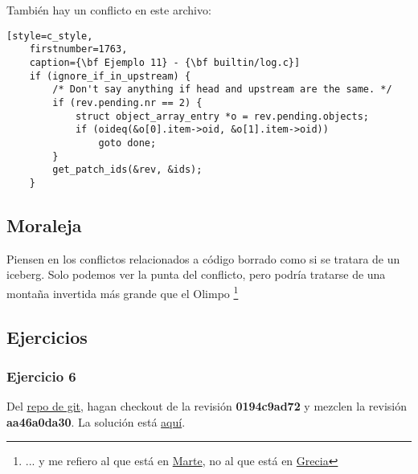 También hay un conflicto en este archivo:
\begin{lstlisting}[style=c_style,
	firstnumber=1763,
	caption={\bf Ejemplo 11} - {\bf builtin/log.c}]
	if (ignore_if_in_upstream) {
		/* Don't say anything if head and upstream are the same. */
		if (rev.pending.nr == 2) {
			struct object_array_entry *o = rev.pending.objects;
			if (oideq(&o[0].item->oid, &o[1].item->oid))
				goto done;
		}
		get_patch_ids(&rev, &ids);
	}
\end{lstlisting}


\subsection{Moraleja}
Piensen en los conflictos relacionados a código borrado como si se tratara de un iceberg. Solo podemos ver la
punta del conflicto, pero podría tratarse de una montaña invertida más grande que el Olimpo 
\footnote{... y me refiero al que está en \href{https://es.wikipedia.org/wiki/Monte_Olimpo_(Marte)}{Marte}, no al que está
en \href{https://es.wikipedia.org/wiki/Olimpo}{Grecia}}

\subsection{Ejercicios}
\subsubsection{Ejercicio 6}
Del \hyperref[git_repo]{repo de git}, hagan checkout de la revisión {\bf 0194c9ad72} y mezclen la revisión {\bf aa46a0da30}.
La solución está \hyperref[exercise_06]{aquí}.
